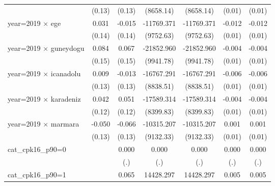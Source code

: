 {\begin{tabular}{l*{6}{c}}
                    &      (0.13)         &      (0.13)         &   (8658.14)         &   (8658.14)         &      (0.01)         &      (0.01)         \\
year=2019 $\times$ ege&       0.031         &      -0.015         &  -11769.371         &  -11769.371         &      -0.012         &      -0.012         \\
                    &      (0.14)         &      (0.14)         &   (9752.63)         &   (9752.63)         &      (0.01)         &      (0.01)         \\
year=2019 $\times$ guneydogu&       0.084         &       0.067         &  -21852.960\sym{*}  &  -21852.960\sym{*}  &      -0.004         &      -0.004         \\
                    &      (0.15)         &      (0.15)         &   (9941.78)         &   (9941.78)         &      (0.01)         &      (0.01)         \\
year=2019 $\times$ icanadolu&       0.009         &      -0.013         &  -16767.291         &  -16767.291         &      -0.006         &      -0.006         \\
                    &      (0.13)         &      (0.13)         &   (8838.51)         &   (8838.51)         &      (0.01)         &      (0.01)         \\
year=2019 $\times$ karadeniz&       0.042         &       0.051         &  -17589.314\sym{*}  &  -17589.314\sym{*}  &      -0.004         &      -0.004         \\
                    &      (0.12)         &      (0.12)         &   (8399.83)         &   (8399.83)         &      (0.01)         &      (0.01)         \\
year=2019 $\times$ marmara&      -0.050         &      -0.066         &  -10315.207         &  -10315.207         &       0.001         &       0.001         \\
                    &      (0.13)         &      (0.13)         &   (9132.33)         &   (9132.33)         &      (0.01)         &      (0.01)         \\
cat\_cpk16\_p90=0     &                     &       0.000         &       0.000         &       0.000         &       0.000         &       0.000         \\
                    &                     &         (.)         &         (.)         &         (.)         &         (.)         &         (.)         \\
cat\_cpk16\_p90=1     &                     &       0.065\sym{**} &   14428.297\sym{***}&   14428.297\sym{***}&       0.005\sym{**} &       0.005\sym{**} \\

\end{tabular}}

